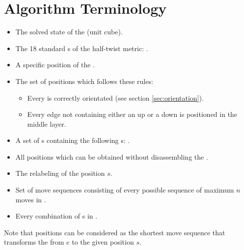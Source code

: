 \section{Algorithm Terminology}
\begin{itemize}
\item {}The solved state of the \rubik{} (unit cube).
\item {}The 18 standard \twist{}s of the half-twist metric: .
\item {}A specific position of the \rubik{}.
\item {}The set of positions which follows these rules:
\begin{itemize}
	\item Every \cpiece{} is correctly orientated (see section \ref{sec:orientation}).
	\item Every edge \cpiece{} not containing either an up \facelet{} or a down \facelet{} is positioned in the middle layer.
\end{itemize}
\item {}A set of \twist{}s containing the following \twist{}s: .
\item {}All positions which can be obtained without disassembling the \rubik{}. 
\item {}The relabeling of the position $s$.
\item {}Set of move sequences consisting of every possible sequence of maximum $n$ moves in .
\item {}Every combination of \twist{}s in .
\end{itemize}
Note that positions can be considered as the shortest move sequence that transforms the \cube{} from $e$ to the given position $s$.

